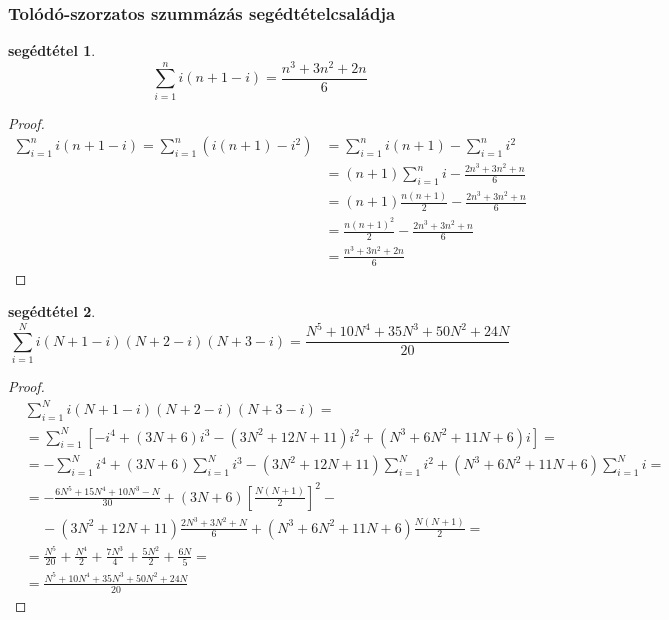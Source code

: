 \documentclass{article}
\newtheorem{lemm}{segédtétel}
\newcommand{\squareparenthesed}[1]{\left[#1\right]}
\newcommand{\parenthesed}[1]{\left(#1\right)}
\begin{document}
	\subsubsection{Tolódó-szorzatos szummázás segédtételcsaládja}

	\begin{lemm}
		\[\sum_{i=1}^n i\parenthesed{n+1-i} = \frac{n^3+3n^2+2n}{6}\]
	\end{lemm}
	\begin{proof}
		\begin{align}
			\sum_{i=1}^n i\parenthesed{n+1-i} = \sum_{i=1}^n\parenthesed{i\parenthesed{n+1} - i^2} &= \sum_{i=1}^n i\parenthesed{n+1} - \sum_{i=1}^n i^2\\
			                                                                                       &= \parenthesed{n+1}\sum_{i=1}^n i - \frac{2n^3+3n^2+n}{6}\\
			                                                                                       &= \parenthesed{n+1}\frac{n\parenthesed{n+1}}2 - \frac{2n^3+3n^2+n}{6}\\
			                                                                                       &= \frac{n\parenthesed{n+1}^2}2 - \frac{2n^3+3n^2+n}{6}\\
			                                                                                       &= \frac{n^3+3n^2+2n}{6}
		\end{align}
	\end{proof}

	\begin{lemm}
		\[
			\sum_{i=1}^N i\parenthesed{N+1-i}\parenthesed{N+2-i}\parenthesed{N+3-i} = \frac{N^5 + 10N^4 + 35N^3 +50N^2 + 24N}{20}
		\]
	\end{lemm}
	\begin{proof}
		\begin{align*}
			&\sum_{i=1}^N i\parenthesed{N+1-i}\parenthesed{N+2-i}\parenthesed{N+3-i} ={}\\
			&=  \sum_{i=1}^N\squareparenthesed{-i^4 + \parenthesed{3N+6}i^3 - \parenthesed{3N^2+12N+11}i^2 + \parenthesed{N^3+6N^2+11N+6}i}={}\\
			&= -\sum_{i=1}^N i^4 + \parenthesed{3N+6}\sum_{i=1}^N i^3 - \parenthesed{3N^2+12N+11}\sum_{i=1}^N i^2 + \parenthesed{N^3+6N^2+11N+6}\sum_{i=1}^Ni={}\\
			&= -\frac{6N^5+15N^4+10N^3-N}{30} + \parenthesed{3N+6}\squareparenthesed{\frac{N\parenthesed{N+1}}2}^2 - {}\\
			&\,\,\,\,\,\,\,- \parenthesed{3N^2+12N+11}\frac{2N^3+3N^2+N}6 + \parenthesed{N^3+6N^2+11N+6}\frac{N\parenthesed{N+1}}2 = {}\\
			&= \frac{N^5}{20} + \frac{N^4}2 + \frac{7N^3}4 + \frac{5N^2}2 + \frac{6N}5 = {}\\
			&= \frac{N^5 + 10N^4 + 35N^3 +50N^2 + 24N}{20}
		\end{align*}
	\end{proof}
\end{document}
